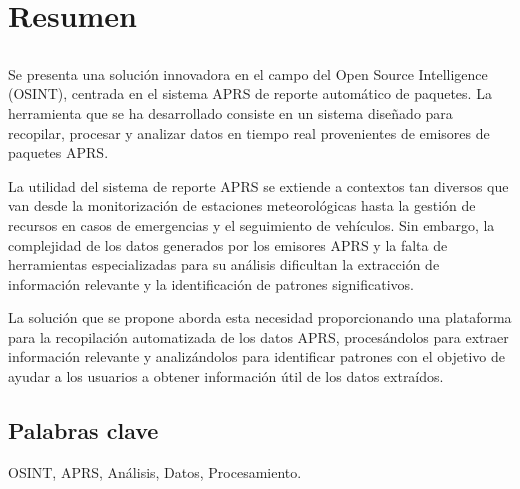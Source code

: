 \chapter*{Resumen}

\section*{\tituloPortadaVal}

Se presenta una solución innovadora en el campo del Open Source Intelligence (OSINT), centrada en el sistema APRS de reporte automático de paquetes. La herramienta que se ha desarrollado consiste en un sistema diseñado para recopilar, procesar y analizar datos en tiempo real provenientes de emisores de paquetes APRS.

	La utilidad del sistema de reporte APRS se extiende a contextos tan diversos que van desde la monitorización de estaciones meteorológicas hasta la gestión de recursos en casos de emergencias y el seguimiento de vehículos. Sin embargo, la complejidad de los datos generados por los emisores APRS y la falta de herramientas especializadas para su análisis dificultan la extracción de información relevante y la identificación de patrones significativos.

	La solución que se propone aborda esta necesidad proporcionando una plataforma para la recopilación automatizada de los datos APRS, procesándolos para extraer información relevante y analizándolos para identificar patrones con el objetivo de ayudar a los usuarios a obtener información útil de los datos extraídos.


\section*{Palabras clave}
   
\noindent OSINT, APRS, Análisis, Datos, Procesamiento.

   


